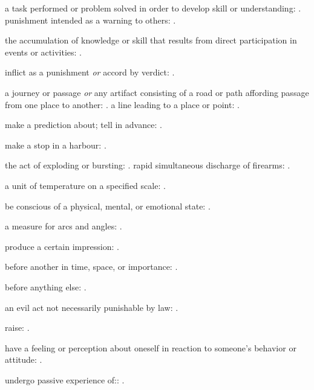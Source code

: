   a task performed or problem solved in order to develop skill or understanding:   . punishment intended as a warning to others:   .

  the accumulation of knowledge or skill that results from direct participation in events or activities: .

  inflict as a punishment \textit{or} accord by verdict: .

  a journey or passage \textit{or} any artifact consisting of a road or path affording passage from one place to another: . a line leading to a place or point:   .

  make a prediction about; tell in advance:   .

  make a stop in a harbour: .

  the act of exploding or bursting:   . rapid simultaneous discharge of firearms:   .

  a unit of temperature on a specified scale: .

  be conscious of a physical, mental, or emotional state: .

  a measure for arcs and angles:   .

  produce a certain impression: .

  before another in time, space, or importance: .

  before anything else:   .

  an evil act not necessarily punishable by law: .

  raise: .

  have a feeling or perception about oneself in reaction to someone's behavior or attitude: .

  undergo passive experience of:: .

